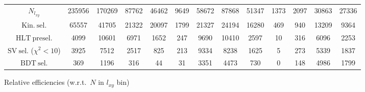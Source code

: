 \documentclass[10pt,a4paper]{article}
\begin{document}
\begin{landscape}
{\begin{tabular}{c|cccc|cccc|cccc}
\midrule
$N_{l_{xy}}$ & 235956 & 170269 & 87762 & 46462 & 9649 & 58672 & 87868 & 51347 & 1373 & 2097 & 30863 & 27336\\
$\mathrm{Kin.\ sel.}$ & 65557 & 41705 & 21322 & 20097 & 1799 & 21327 & 24194 & 16280 & 469 & 940 & 13209 & 9364\\
$\mathrm{HLT\ presel.}$ & 4099 & 10601 & 6971 & 1652 & 247 & 9690 & 10410 & 2597 & 10 & 316 & 6096 & 2253\\
$\mathrm{SV\ sel.}$ ($\chi^2{<}10$) & 3925 & 7512 & 2517 & 825 & 213 & 9334 & 8238 & 1625 & 5 & 273 & 5339 & 1837\\
$\mathrm{BDT\ sel.}$ & 369 & 1196 & 316 & 44 & 31 & 3351 & 4473 & 730 & 0 & 148 & 4986 & 1799\\
\bottomrule
\end{tabular}}

\vspace{18pt}

Relative efficiencies (w.r.t.\ $N$ in $l_{xy}$ bin)


\end{landscape}
\end{document}
